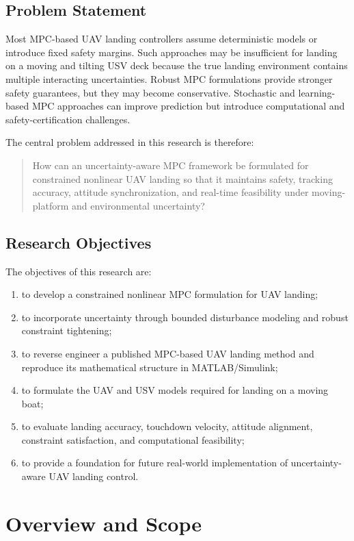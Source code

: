 \documentclass[12pt,a4paper]{report}
\begin{document}
\section{Problem Statement}
Most MPC-based UAV landing controllers assume deterministic models or introduce fixed safety margins. Such approaches may be insufficient for landing on a moving and tilting USV deck because the true landing environment contains multiple interacting uncertainties. Robust MPC formulations provide stronger safety guarantees, but they may become conservative. Stochastic and learning-based MPC approaches can improve prediction but introduce computational and safety-certification challenges.

The central problem addressed in this research is therefore:
\begin{quote}
How can an uncertainty-aware MPC framework be formulated for constrained nonlinear UAV landing so that it maintains safety, tracking accuracy, attitude synchronization, and real-time feasibility under moving-platform and environmental uncertainty?
\end{quote}

\section{Research Objectives}
The objectives of this research are:
\begin{enumerate}
    \item to develop a constrained nonlinear MPC formulation for UAV landing;
    \item to incorporate uncertainty through bounded disturbance modeling and robust constraint tightening;
    \item to reverse engineer a published MPC-based UAV landing method and reproduce its mathematical structure in MATLAB/Simulink;
    \item to formulate the UAV and USV models required for landing on a moving boat;
    \item to evaluate landing accuracy, touchdown velocity, attitude alignment, constraint satisfaction, and computational feasibility;
    \item to provide a foundation for future real-world implementation of uncertainty-aware UAV landing control.
\end{enumerate}

\chapter{Overview and Scope}
\end{document}
